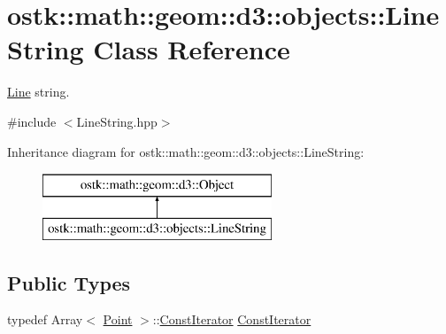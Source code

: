 \hypertarget{classostk_1_1math_1_1geom_1_1d3_1_1objects_1_1_line_string}{}\section{ostk\+:\+:math\+:\+:geom\+:\+:d3\+:\+:objects\+:\+:Line\+String Class Reference}
\label{classostk_1_1math_1_1geom_1_1d3_1_1objects_1_1_line_string}


\hyperlink{classostk_1_1math_1_1geom_1_1d3_1_1objects_1_1_line}{Line} string.  




{\ttfamily \#include $<$Line\+String.\+hpp$>$}

Inheritance diagram for ostk\+:\+:math\+:\+:geom\+:\+:d3\+:\+:objects\+:\+:Line\+String\+:\begin{figure}[H]
\begin{center}
\leavevmode
\includegraphics[height=2.000000cm]{classostk_1_1math_1_1geom_1_1d3_1_1objects_1_1_line_string}
\end{center}
\end{figure}
\subsection*{Public Types}
\begin{DoxyCompactItemize}
\item 
typedef Array$<$ \hyperlink{classostk_1_1math_1_1geom_1_1d3_1_1objects_1_1_point}{Point} $>$\+::\hyperlink{classostk_1_1math_1_1geom_1_1d3_1_1objects_1_1_line_string_a5d184ce7a4ef5613a621f9b628e56de8}{Const\+Iterator} \hyperlink{classostk_1_1math_1_1geom_1_1d3_1_1objects_1_1_line_string_a5d184ce7a4ef5613a621f9b628e56de8}{Const\+Iterator}
\end{DoxyCompactItemize}
